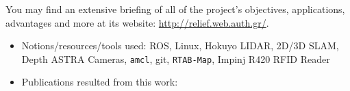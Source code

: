 You may find an extensive briefing of all of the project's objectives,
applications, advantages and more at its website:
\url{http://relief.web.auth.gr/}.



\begin{itemize}
\item Notions/resources/tools used: ROS, Linux, Hokuyo LIDAR, 2D/3D SLAM, Depth ASTRA Cameras, \texttt{amcl}, git, \texttt{RTAB-Map}, Impinj R420 RFID Reader
\item Publications resulted from this work: \cite{8739423,8739486,Filotheou2020a,9109328,9244904,Filotheou2020b,9566425,9617436}
\end{itemize}
